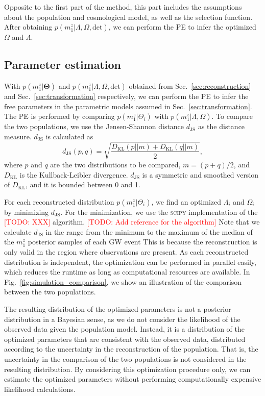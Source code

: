 \documentclass[twocolumn]{aastex631}
\newcommand{\todo}[1]{\textcolor{red}{[TODO: #1]}}
\begin{document}
Opposite to the first part of the method, this part includes the assumptions about the population and cosmological model, as well as the selection function.
After obtaining $p(m^z_1|\Lambda, \Omega, \mathrm{det})$, we can perform the \ac{PE} to infer the optimized $\Omega$ and $\Lambda$.

\subsection{Parameter estimation}
\label{sec:pe}

With $p(m^z_1|\mathbf{\Theta})$ and $p(m^z_1|\Lambda, \Omega, \mathrm{det})$ obtained from Sec.~\ref{sec:reconstruction} and Sec.~\ref{sec:transformation} respectively, we can perform the \ac{PE} to infer the free parameters in the parametric models assumed in Sec.~\ref{sec:transformation}.
The \ac{PE} is performed by comparing $p(m^z_1|\Theta_i)$ with $p(m^z_1|\Lambda, \Omega)$.
To compare the two populations, we use the Jensen-Shannon distance $d_\mathrm{JS}$ as the distance measure.
$d_\mathrm{JS}$ is calculated as
\begin{equation}
    d_\mathrm{JS}(p, q) = \sqrt{\frac{D_\mathrm{KL}(p||m) + D_\mathrm{KL}(q||m)}{2}},
\end{equation}
where $p$ and $q$ are the two distributions to be compared, $m = (p + q) / 2$, and $D_\mathrm{KL}$ is the Kullback-Leibler divergence.
$d_\mathrm{JS}$ is a symmetric and smoothed version of $D_\mathrm{KL}$, and it is bounded between 0 and 1.

For each reconstructed distribution $p(m^z_1|\Theta_i)$, we find an optimized $\Lambda_i$ and $\Omega_i$ by minimizing $d_\mathrm{JS}$.
For the minimization, we use the \textsc{scipy} \citep{2020SciPy-NMeth} implementation of the \todo{XXX} algorithm. \todo{Add reference for the algorithm}
Note that we calculate $d_\mathrm{JS}$ in the range from the minimum to the maximum of the median of the $m^z_1$ posterior samples of each \ac{GW} event
This is because the reconstruction is only valid in the region where observations are present.
As each reconstructed distribution is independent, the optimization can be performed in parallel easily, which reduces the runtime as long as computational resources are available.
In Fig.~\ref{fig:simulation_comparison}, we show an illustration of the comparison between the two populations.

The resulting distribution of the optimized parameters is not a posterior distribution in a Bayesian sense, as we do not consider the likelihood of the observed data given the population model.
Instead, it is a distribution of the optimized parameters that are consistent with the observed data, distributed according to the uncertainty in the reconstruction of the population.
That is, the uncertainty in the comparison of the two populations is not considered in the resulting distribution.
By considering this optimization procedure only, we can estimate the optimized parameters without performing computationally expensive likelihood calculations.
\end{document}
